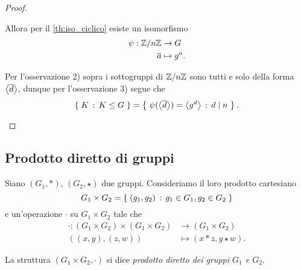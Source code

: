 \begin{proof}
\begin{enumerate}[label={(\roman*)}]
        Allora per il \autoref{th:iso_ciclico} esiste un isomorfismo \begin{align*}
            \psi : \Zmod n &\to G\\
            \eqclass a &\mapsto g^a.
        \end{align*}

        Per l'osservazione 2) sopra i sottogruppi di $\mathbb{Z}/n\mathbb{Z}$ sono tutti e solo della forma $\displaystyle \cycl*{\eqclass{d}}$, dunque per l'osservazione 3) segue che \[
            \set{K \suchthat K \leq G} = \set{
                \psi(\cycl*{\eqclass{d}}) 
            = \cycl*{g^{d}} \suchthat d \divides n}. \qedhere   
        \] 
    \end{enumerate}
\end{proof}

\subsection{Prodotto diretto di gruppi}

\begin{definition}
    Siano $(G_1, *)$, $(G_2, \star)$ due gruppi. Consideriamo il loro prodotto cartesiano \[
        G_1 \times G_2 = \left\{\;(g_1, g_2) \,:\, g_1 \in G_1, g_2 \in G_2\;\right\}    
    \] e un'operazione $\cdot$ su $G_1 \times G_2$ tale che \begin{align*}
    \cdot : (G_1 \times G_2) \times (G_1 \times G_2) &\to (G_1 \times G_2)\\
    ((x, y), (z, w)) &\mapsto (x * z, y \star w).
    \end{align*}
    
    La struttura $(G_1 \times G_2, \cdot)$ si dice \emph{prodotto diretto dei gruppi $G_1$ e $G_2$}.
\end{definition}

